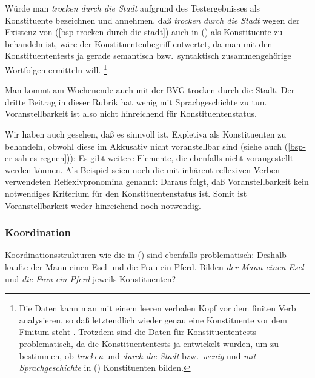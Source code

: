 Würde man \emph{trocken durch die Stadt} aufgrund des Testergebnisses als Konstituente bezeichnen
und annehmen, daß \emph{trocken durch die Stadt} wegen der Existenz von (\ref{bsp-trocken-durch-die-stadt})
auch in () als Konstituente zu behandeln ist, 
wäre der Konstituentenbegriff entwertet, da man mit den Konstituententests ja gerade semantisch
bzw.\ syntaktisch zusammengehörige Wortfolgen ermitteln will.%
\footnote{
  Die Daten kann man mit einem leeren verbalen Kopf vor dem finiten Verb analysieren,
  so daß letztendlich wieder genau eine Konstituente vor dem Finitum steht \citep{Mueller2005d}.
  Trotzdem sind die Daten für Konstituententests problematisch, da die Konstituententests
  ja entwickelt wurden, um zu bestimmen, ob \zb \emph{trocken} und \emph{durch die Stadt}
  bzw.\ \emph{wenig} und \emph{mit Sprachgeschichte} in () Konstituenten bilden.%
}

\eal
\ex Man kommt am Wochenende auch mit der BVG trocken durch die Stadt.
\ex Der dritte Beitrag in dieser Rubrik hat wenig mit Sprachgeschichte zu tun.
\zl
Voranstellbarkeit ist also nicht hinreichend für Konstituentenstatus.

Wir haben auch gesehen, daß es sinnvoll ist, Expletiva als Konstituenten zu behandeln,
obwohl diese im Akkusativ nicht voranstellbar sind (siehe auch (\ref{bsp-er-sah-es-regnen})):
\eal
{}
\zl
Es gibt weitere Elemente, die ebenfalls nicht vorangestellt werden können. Als Beispiel
seien noch die mit inhärent reflexiven Verben verwendeten Reflexivpronomina genannt:
\eal
{}
\zl
Daraus folgt, daß Voranstellbarkeit kein notwendiges Kriterium für den Konstituentenstatus
ist. Somit ist Voranstellbarkeit weder hinreichend noch notwendig.


\subsubsection{Koordination}

Koordinationsstrukturen wie die in () sind ebenfalls problematisch:
\ea
\label{ex-gapping}
Deshalb kaufte der Mann einen Esel und die Frau ein Pferd.
\z
Bilden \emph{der Mann einen Esel} und \emph{die Frau ein Pferd} jeweils Konstituenten?

